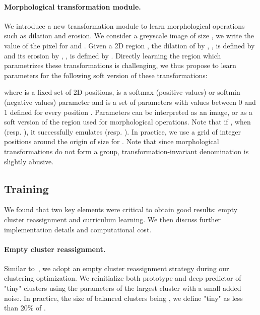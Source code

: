 \documentclass{article}
\begin{document}
\vspace{-0.7em}
\paragraph{Morphological transformation module.} We introduce a new transformation module to 
learn morphological operations~\cite{haralick1987image} such as dilation and erosion. We 
consider a greyscale image  of size , we write  the value 
of the pixel  for  and . Given a 2D region 
, the dilation of  by , , is defined by 
 and its erosion by , 
, is defined by . Directly learning the region  which parametrizes these transformations 
is challenging, we thus propose to learn parameters  for the following soft 
version of these transformations:


where  is a fixed set of 2D positions,  is a softmax (positive values) or softmin 
(negative values) parameter and  is a set of parameters with values between 0 and 1 
defined for every position . Parameters  can be interpreted as an image, or 
as a soft version of the region  used for morphological operations. Note that if 
, when  (resp.  
), it successfully emulates  (resp. ). In practice, we 
use a grid of integer positions around the origin of size  for . Note that 
since morphological transformations do not form a group, transformation-invariant 
denomination is slightly abusive.

\subsection{Training}\label{sec:training}

We found that two key elements were critical to obtain good results: empty cluster 
reassignment and curriculum learning. We then discuss further implementation details and 
computational cost.

\vspace{-0.7em}
\paragraph{Empty cluster reassignment.} Similar 
to~\cite{caronDeepClusteringUnsupervised2018}, we adopt an empty cluster reassignment 
strategy during our clustering optimization. We reinitialize both prototype and deep 
predictor of "tiny" clusters using the parameters of the largest cluster with a small added 
noise. In practice, the size of balanced clusters being , we define "tiny" as less than 
20\% of .

\vspace{-0.7em}
\end{document}
